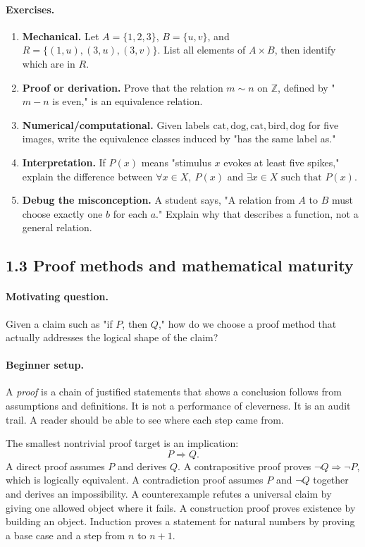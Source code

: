 \paragraph{Exercises.}
\begin{enumerate}[label=\textbf{1.2.\arabic*.}, leftmargin=*]
\item \textbf{Mechanical.} Let \(A=\{1,2,3\}\), \(B=\{u,v\}\), and \(R=\{(1,u),(3,u),(3,v)\}\). List all elements of \(A\times B\), then identify which are in \(R\).
\item \textbf{Proof or derivation.} Prove that the relation \(m\sim n\) on \(\mathbb{Z}\), defined by " \(m-n\) is even," is an equivalence relation.
\item \textbf{Numerical/computational.} Given labels \(\text{cat},\text{dog},\text{cat},\text{bird},\text{dog}\) for five images, write the equivalence classes induced by "has the same label as."
\item \textbf{Interpretation.} If \(P(x)\) means "stimulus \(x\) evokes at least five spikes," explain the difference between \(\forall x\in X,\ P(x)\) and \(\exists x\in X\text{ such that }P(x)\).
\item \textbf{Debug the misconception.} A student says, "A relation from \(A\) to \(B\) must choose exactly one \(b\) for each \(a\)." Explain why that describes a function, not a general relation.
\end{enumerate}

\subsection{1.3 Proof methods and mathematical maturity}

\paragraph{Motivating question.}
Given a claim such as "if \(P\), then \(Q\)," how do we choose a proof method that actually addresses the logical shape of the claim?

\paragraph{Beginner setup.}
A \emph{proof} is a chain of justified statements that shows a conclusion follows from assumptions and definitions. It is not a performance of cleverness. It is an audit trail. A reader should be able to see where each step came from.

The smallest nontrivial proof target is an implication:
\[
P\Rightarrow Q.
\]
A direct proof assumes \(P\) and derives \(Q\). A contrapositive proof proves \(\neg Q\Rightarrow \neg P\), which is logically equivalent. A contradiction proof assumes \(P\) and \(\neg Q\) together and derives an impossibility. A counterexample refutes a universal claim by giving one allowed object where it fails. A construction proof proves existence by building an object. Induction proves a statement for natural numbers by proving a base case and a step from \(n\) to \(n+1\).

